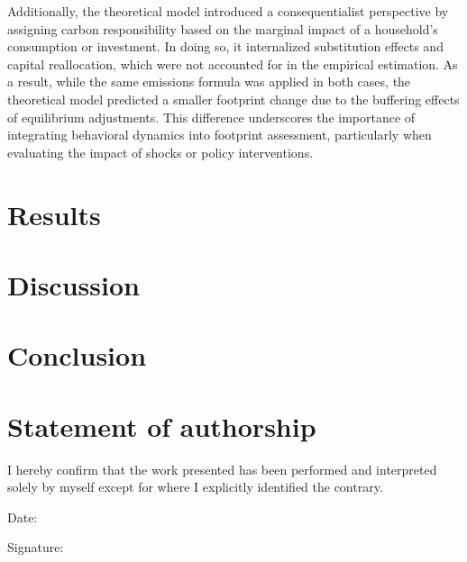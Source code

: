 \documentclass[12pt,a4paper]{article}%
\begin{document}
Additionally, the theoretical model introduced a consequentialist perspective by assigning carbon responsibility based on the marginal impact of a household's consumption or investment. In doing so, it internalized substitution effects and capital reallocation, which were not accounted for in the empirical estimation. As a result, while the same emissions formula was applied in both cases, the theoretical model predicted a smaller footprint change due to the buffering effects of equilibrium adjustments. This difference underscores the importance of integrating behavioral dynamics into footprint assessment, particularly when evaluating the impact of shocks or policy interventions.

\section{Results}

\section{Discussion}

\section{Conclusion}

\newpage
\begin{thebibliography}{9}
\end{thebibliography}

\newpage
\thispagestyle{empty}
\section*{Statement of authorship}
I hereby confirm that the work presented has been performed and interpreted solely by myself except for where I explicitly identified the contrary.

\vspace{2cm}
Date: \underline{\hspace{5cm}}

\vspace{1cm}
Signature: \underline{\hspace{5cm}}
\end{document}
